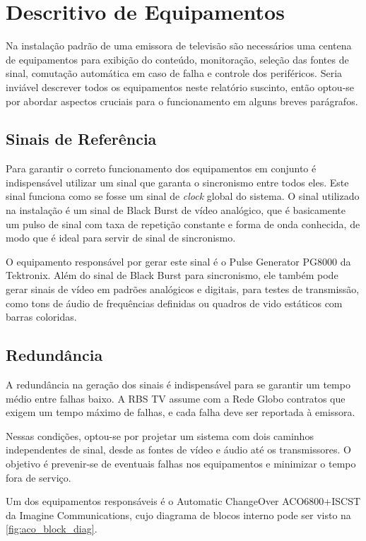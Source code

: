 \documentclass[
	12pt,				%
	oneside,			%
	a4paper,			%
	brazil
	]{abntex2}
\begin{document}
\section{Descritivo de Equipamentos}

Na instalação padrão de uma emissora de televisão são necessários uma centena de equipamentos para exibição do conteúdo, monitoração, seleção das fontes de sinal, comutação automática em caso de falha e controle dos periféricos. Seria inviável descrever todos os equipamentos neste relatório suscinto, então optou-se por abordar aspectos cruciais para o funcionamento em alguns breves parágrafos.

\subsection{Sinais de Referência}

Para garantir o correto funcionamento dos equipamentos em conjunto é indispensável utilizar um sinal que garanta o sincronismo entre todos eles. Este sinal funciona como se fosse um sinal de \textit{clock} global do sistema. O sinal utilizado na instalação é um sinal de Black Burst de vídeo analógico, que é basicamente um pulso de sinal com taxa de repetição constante e forma de onda conhecida, de modo que é ideal para servir de sinal de sincronismo.

O equipamento responsável por gerar este sinal é o Pulse Generator PG8000 da Tektronix. Além do sinal de Black Burst para sincronismo, ele também pode gerar sinais de vídeo em padrões analógicos e digitais, para testes de transmissão, como tons de áudio de frequências definidas ou quadros de vido estáticos com barras coloridas.

\subsection{Redundância}

A redundância na geração dos sinais é indispensável para se garantir um tempo médio entre falhas baixo. A RBS TV assume com a Rede Globo contratos que exigem um tempo máximo de falhas, e cada falha deve ser reportada à emissora.

Nessas condições, optou-se por projetar um sistema com dois caminhos independentes de sinal, desde as fontes de vídeo e áudio até os transmissores. O objetivo é prevenir-se de eventuais falhas nos equipamentos e minimizar o tempo fora de serviço.

Um dos equipamentos responsáveis é o Automatic ChangeOver ACO6800+ISCST da Imagine Communications\cite{harris}, cujo diagrama de blocos interno pode ser visto na \autoref{fig:aco_block_diag}.
\end{document}

